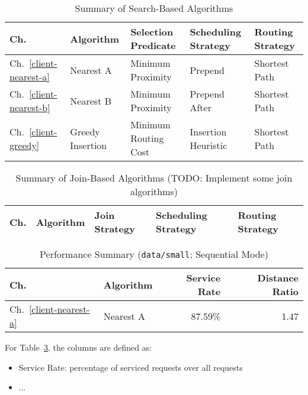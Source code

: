 \begin{table}[h]
\begin{center}
\caption{Summary of Search-Based Algorithms}
\label{tab:search-algorithms}
\begin{tabular}{|l|l|l|l|l|}
\hline
Ch. & Algorithm & Selection Predicate & Scheduling Strategy & Routing Strategy \\
\hline
Ch.~\ref{client-nearest-a} & Nearest A & Minimum Proximity & Prepend & Shortest Path \\
Ch.~\ref{client-nearest-b} & Nearest B & Minimum Proximity & Prepend After& Shortest Path \\
Ch.~\ref{client-greedy} & Greedy Insertion & Minimum Routing Cost & Insertion Heuristic & Shortest Path \\
\hline
\end{tabular}
\end{center}
\end{table}

\begin{table}[h]
\begin{center}
\caption{Summary of Join-Based Algorithms (TODO: Implement some join algorithms)}
\label{tab:join-algorithms}
\begin{tabular}{|l|l|l|l|l|}
\hline
Ch. & Algorithm & Join Strategy & Scheduling Strategy & Routing Strategy \\
\hline
\end{tabular}
\end{center}
\end{table}

\begin{table}[h]
\begin{center}
\caption{Performance Summary (\texttt{data/small}; Sequential Mode)}
\label{tab:performance-summary}
\begin{tabular}{|l|l|r|r|}
\hline
Ch. & Algorithm & Service Rate & Distance Ratio \\
\hline
Ch.~\ref{client-nearest-a} & Nearest A & 87.59\% & 1.47 \\
\hline
\end{tabular}
\end{center}
\end{table}

For Table~\ref{tab:performance-summary}, the columns are defined as:

\begin{itemize}
\item Service Rate: percentage of serviced requests over all requests
\item ...
\end{itemize}


